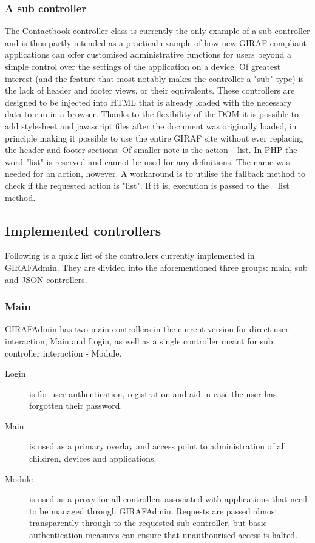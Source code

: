 \subsubsection*{A sub controller}
\label{controller_sub}


The Contactbook controller class is currently the only example of a sub controller and is thus partly intended as a practical example of how new GIRAF-compliant applications can offer customised administrative functions for users beyond a simple control over the settings of the application on a device.
Of greatest interest (and the feature that most notably makes the controller a "sub" type) is the lack of header and footer views, or their equivalents. These controllers are designed to be injected into HTML that is already loaded with the necessary data to run in a browser. Thanks to the flexibility of the DOM it is possible to add stylesheet and javascript files after the document was originally loaded, in principle making it possible to use the entire GIRAF site without ever replacing the header and footer sections.
Of smaller note is the action  \_list. In PHP the word "list" is reserved and cannot be used for any definitions. The name was needed for an action, however. A workaround is to utilise the fallback method to check if the requested action is "list". If it is, execution is passed to the \_list method.

\subsection{Implemented controllers}
Following is a quick list of the controllers currently implemented in GIRAFAdmin. They are divided into the aforementioned three groups: main, sub and JSON controllers.

\subsubsection*{Main}
GIRAFAdmin has two main controllers in the current version for direct user interaction, Main and Login, as well as a single controller meant for sub controller interaction - Module.
\begin{description}
    \item[Login] is for user authentication, registration and aid in case the user has forgotten their password.
    \item[Main] is used as a primary overlay and access point to administration of all children, devices and applications.
    \item[Module] is used as a proxy for all controllers associated with applications that need to be managed through GIRAFAdmin. Requests are passed almost transparently through to the requested sub controller, but basic authentication measures can ensure that unauthourised access is halted.
\end{description}

